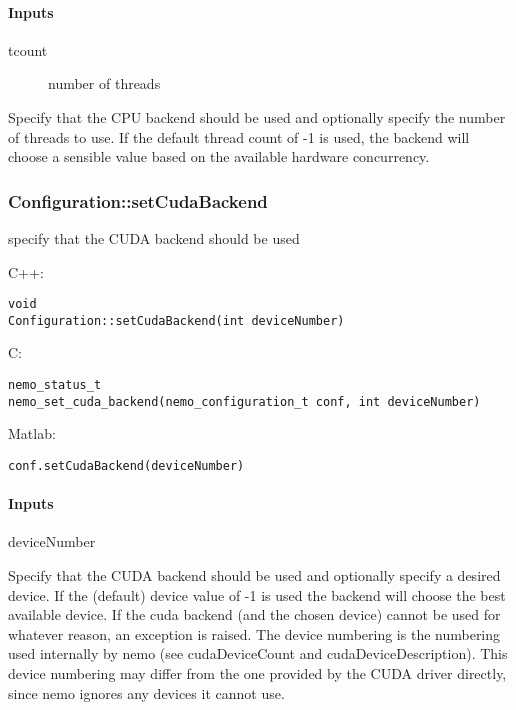 \paragraph{Inputs}
\begin{description}
\item[tcount] number of threads
\end{description}
Specify that the CPU backend should be used and optionally specify the number of threads to use. If the default thread count of -1 is used, the backend will choose a sensible value based on the available hardware concurrency.

\clearpage
\subsubsection*{Configuration::setCudaBackend}
\label{fn: setCudaBackend}
specify that the CUDA backend should be used


\noindent C++:
\begin{lstlisting}[aboveskip=2pt]
void
Configuration::setCudaBackend(int deviceNumber)
\end{lstlisting}

\noindent C:
\begin{lstlisting}[aboveskip=2pt]
nemo_status_t
nemo_set_cuda_backend(nemo_configuration_t conf, int deviceNumber)
\end{lstlisting}

\noindent Matlab:
\begin{lstlisting}[aboveskip=2pt]
conf.setCudaBackend(deviceNumber)
\end{lstlisting}
\paragraph{Inputs}
\begin{description}
\item[deviceNumber]
\end{description}
Specify that the CUDA backend should be used and optionally specify a desired device. If the (default) device value of -1 is used the backend will choose the best available device.   If the cuda backend (and the chosen device) cannot be used for  whatever reason, an exception is raised.   The device numbering is the numbering used internally by nemo (see  cudaDeviceCount and cudaDeviceDescription). This device  numbering may differ from the one provided by the CUDA driver  directly, since nemo ignores any devices it cannot use. 

\clearpage
